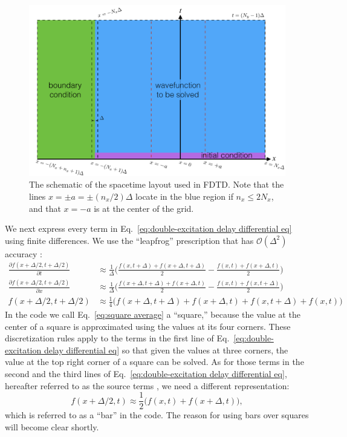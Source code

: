 \documentclass[12pt,letter,onecolumn,notitlepage]{article}
\begin{document}
\begin{figure}[bhtp]
	\centering
	\includegraphics[scale=0.65]{FDTD_schematic}
	\caption{The schematic of the spacetime layout used in FDTD. Note that the lines $x=\pm a=\pm (n_x/2)\Delta$ locate in the blue region if $n_x\leq2N_x$, and that $x=-a$ is at the center of the grid.}
	\label{fig:FDTD_schematic}
\end{figure}


We next express every term in Eq.~\eqref{eq:double-excitation delay differential eq} using finite differences. We use the ``leapfrog'' prescription that has $\mathcal{O}(\Delta^2)$ accuracy \cite{NumericalRecipes}:
\begin{align}
	\frac{\partial f(x+\Delta/2,t+\Delta/2)}{\partial t} & \approx\frac{1}{\Delta} \biggl(\frac{f(x,t+\Delta)+f(x+\Delta,t+\Delta)}{2}
		-\frac{f(x,t)+f(x+\Delta,t)}{2}\biggr)\\
	\frac{\partial f(x+\Delta/2,t+\Delta/2)}{\partial x} &\approx \frac{1}{\Delta} \biggl(\frac{f(x+\Delta,t+\Delta)+f(x+\Delta,t)}{2}
		-\frac{f(x,t)+f(x,t+\Delta)}{2} \biggr)\\
	f(x+\Delta/2,t+\Delta/2)&\approx \frac{1}{4}\biggl(f(x+\Delta,t+\Delta)+f(x+\Delta,t)
		+f(x,t+\Delta)+f(x,t)\biggr) \label{eq:square average}
\end{align}
In the code we call Eq.~\eqref{eq:square average} a ``square,'' because the value at the center of a square is approximated using the values at its four corners. These discretization rules apply to the terms in the first line of Eq.~\eqref{eq:double-excitation delay differential eq} so that given the values at three corners, the value at the top right corner of a square can be solved. As for those terms in the second and the third lines of Eq.~\eqref{eq:double-excitation delay differential eq}, hereafter referred to as the source terms \cite{FangNM17}, we need a different representation:
\begin{equation}
f(x+\Delta/2,t)\approx \frac{1}{2}\biggl( f(x,t) + f(x+\Delta,t)\biggr), \label{eq:bar average}
\end{equation}
which is referred to as a ``bar'' in the code. The reason for using bars over squares will become clear shortly.
\end{document}
